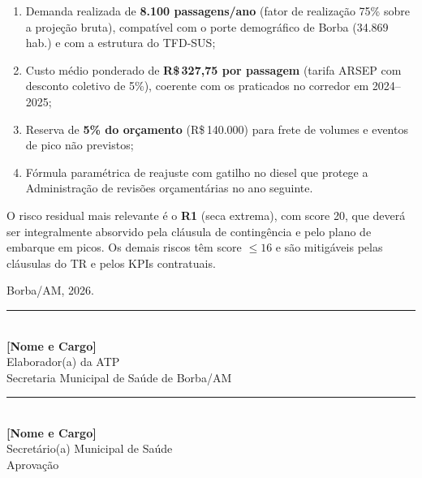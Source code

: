 \documentclass[12pt,a4paper]{article}
\newcommand{\Rs}{R\$\,}
\newcommand{\exercicio}{2026}
\begin{document}
\begin{enumerate}
  \item Demanda realizada de \textbf{8.100 passagens/ano} (fator de
    realização 75\% sobre a projeção bruta), compatível com o porte
    demográfico de Borba (34.869 hab.) e com a estrutura do TFD-SUS;

  \item Custo médio ponderado de \textbf{\Rs 327,75 por passagem}
    (tarifa ARSEP com desconto coletivo de 5\%), coerente com os praticados
    no corredor em 2024--2025;

  \item Reserva de \textbf{5\% do orçamento} (\Rs 140.000) para frete de
    volumes e eventos de pico não previstos;

  \item Fórmula paramétrica de reajuste com gatilho no diesel que protege
    a Administração de revisões orçamentárias no ano seguinte.
\end{enumerate}

O risco residual mais relevante é o \textbf{R1} (seca extrema), com score 20,
que deverá ser integralmente absorvido pela cláusula de contingência e pelo
plano de embarque em picos. Os demais riscos têm score $\leq 16$ e são
mitigáveis pelas cláusulas do TR e pelos KPIs contratuais.

\vspace{1.0cm}
\noindent\hfill Borba/AM, \exercicio.

\vspace{1.2cm}
\begin{minipage}{0.47\linewidth}
\begin{center}
  \rule{7.5cm}{0.5pt}\\[3pt]
  \textbf{[Nome e Cargo]}\\
  \small Elaborador(a) da ATP\\
  \small Secretaria Municipal de Saúde de Borba/AM
\end{center}
\end{minipage}
\hfill
\begin{minipage}{0.47\linewidth}
\begin{center}
  \rule{7.5cm}{0.5pt}\\[3pt]
  \textbf{[Nome e Cargo]}\\
  \small Secretário(a) Municipal de Saúde\\
  \small Aprovação
\end{center}
\end{minipage}
\end{document}
